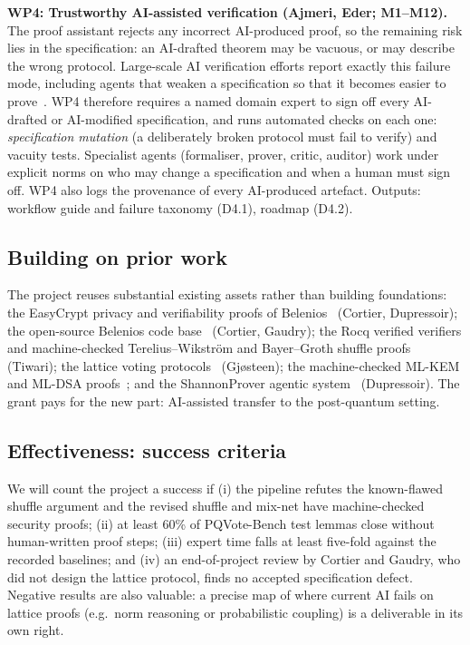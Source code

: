 \documentclass[11pt]{article}
\begin{document}
\textbf{WP4: Trustworthy AI-assisted verification (Ajmeri, Eder; M1--M12).} The proof assistant
rejects any incorrect AI-produced proof, so the remaining risk lies in the specification: an AI-drafted
theorem may be vacuous, or may describe the wrong protocol. Large-scale AI verification efforts report
exactly this failure mode, including agents that weaken a specification so that it becomes easier to
prove~\cite{anthropic2026formal}. WP4 therefore requires a named domain expert to sign off every
AI-drafted or AI-modified specification, and runs automated checks on each one: \emph{specification
mutation} (a deliberately broken protocol must fail to verify) and vacuity tests. Specialist agents (formaliser,
prover, critic, auditor) work under explicit norms on who may change a specification and when a human must sign
off. WP4 also logs the provenance of every AI-produced artefact. Outputs: workflow guide and failure taxonomy (D4.1),
roadmap (D4.2).

\subsection{Building on prior work}
The project reuses substantial existing assets rather than building foundations: the EasyCrypt privacy and
verifiability proofs of Belenios~\cite{cortier2017sp,cortier2018belenioseasycrypt} (Cortier, Dupressoir); the
open-source Belenios code base~\cite{cortier2019belenios} (Cortier, Gaudry); the Rocq verified
verifiers and machine-checked Terelius--Wikstr\"om and Bayer--Groth shuffle proofs~\cite{haines2019verified,287095}
(Tiwari); the lattice voting protocols~\cite{aranha2021shuffle,aranha2023mixnet} (Gj{\o}steen); the machine-checked
ML-KEM and ML-DSA proofs~\cite{almeida2024mlkem,barbosa2023dilithium}; and the ShannonProver agentic
system~\cite{ma2026shannonprover} (Dupressoir). The grant pays for the new part: AI-assisted transfer to the
post-quantum setting.

\subsection{Effectiveness: success criteria}
We will count the project a success if (i) the pipeline refutes the known-flawed shuffle argument and the
revised shuffle and mix-net have machine-checked security proofs; (ii) at least 60\% of PQVote-Bench test lemmas close
without human-written proof steps; (iii) expert time falls at least five-fold against the recorded baselines; and
(iv) an end-of-project review by Cortier and Gaudry, who did not design the lattice protocol, finds no accepted specification defect.
Negative results are also valuable: a precise map of where current AI fails on lattice proofs (e.g.\ norm reasoning
or probabilistic coupling) is a deliverable in its own right.
\end{document}
